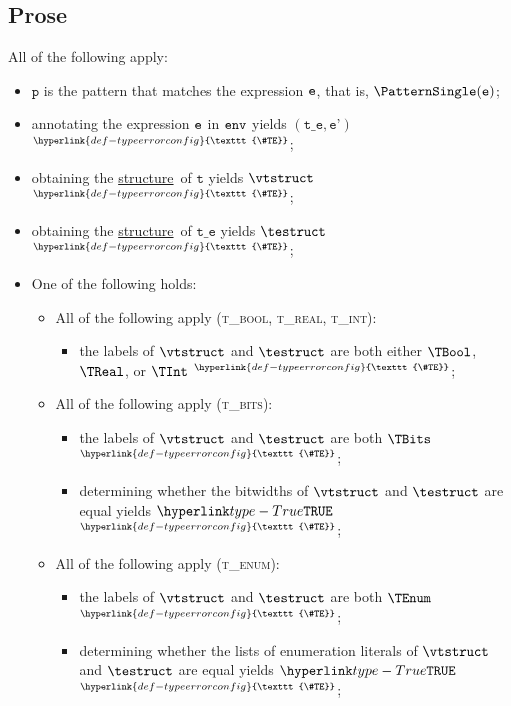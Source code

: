 \documentclass{book}
\newcommand\TypeErrorConfig[0]{\hyperlink{def-typeerrorconfig}{\texttt{\#TE}}}
\newcommand\ProseOrTypeError[0]{\hyperlink{def-proseortypeerror}{$^{\TypeErrorConfig}$}}
\newcommand\structure[0]{\hyperlink{def-structure}{structure}}
\newcommand\vp[0]{\texttt{p}}
\newcommand\vt[0]{\texttt{t}}
\newcommand\vte[0]{\texttt{t\_e}}
\newcommand\vep[0]{\texttt{e'}}
\begin{document}
\subsection{Prose}
All of the following apply:
\begin{itemize}
  \item $\vp$ is the pattern that matches the expression $\texttt{e}$, that is, $\PatternSingle(\ve)$;
  \item annotating the expression $\texttt{e}$ in $\texttt{env}$ yields $(\vte, \vep)$ \ProseOrTypeError;
  \item obtaining the \structure\ of $\vt$ yields $\vtstruct$ \ProseOrTypeError;
  \item obtaining the \structure\ of $\vte$ yields $\testruct$ \ProseOrTypeError;
  \item One of the following holds:
  \begin{itemize}
    \item All of the following apply (\textsc{t\_bool, t\_real, t\_int}):
    \begin{itemize}
      \item the labels of $\vtstruct$ and $\testruct$ are both either $\TBool$, $\TReal$, or $\TInt$ \ProseOrTypeError;
    \end{itemize}

    \item All of the following apply (\textsc{t\_bits}):
    \begin{itemize}
      \item the labels of $\vtstruct$ and $\testruct$ are both $\TBits$ \ProseOrTypeError;
      \item determining whether the bitwidths of $\vtstruct$ and $\testruct$ are equal yields $\True$ \ProseOrTypeError;
    \end{itemize}

    \item All of the following apply (\textsc{t\_enum}):
    \begin{itemize}
      \item the labels of $\vtstruct$ and $\testruct$ are both $\TEnum$ \ProseOrTypeError;
      \item determining whether the lists of enumeration literals of $\vtstruct$ and $\testruct$ are equal yields $\True$ \ProseOrTypeError;
    \end{itemize}


\end{itemize}
\end{itemize}
\end{document}
